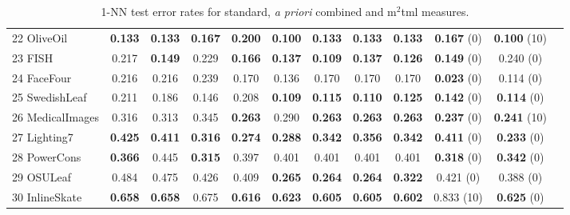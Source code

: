 \begin{table}[h!]
{\begin{tabular}{|l|ccccc|ccc|ccc|}
			22 OliveOil            & \textbf{0.133} & \textbf{0.133} & \textbf{0.167} & \textbf{0.200} & \textbf{0.100}    & \textbf{0.133} & \textbf{0.133} & \textbf{0.133} & \textbf{0.167} (0)  & \textbf{0.100} (10) & \checkmark \\			
			23 FISH                & 0.217 & \textbf{0.149} & 0.229 & \textbf{0.166} & \textbf{0.137}   & \textbf{0.109} & \textbf{0.137} & \textbf{0.126} & \textbf{0.149} (0)  & 0.240 (0) & \checkmark  \\			
			24 FaceFour            & 0.216 & 0.216 & 0.239 & 0.170 & 0.136 & 0.170 & 0.170 & 0.170 & \textbf{0.023} (0)     & 0.114 (0)  & \checkmark \\
			25 SwedishLeaf         & 0.211 & 0.186 & 0.146 & 0.208 & \textbf{0.109} & \textbf{0.115} & \textbf{0.110} & \textbf{0.125} & \textbf{0.142} (0) & \textbf{0.114} (0) & \checkmark \\			
			26 MedicalImages       & 0.316 & 0.313 & 0.345 & \textbf{0.263} & 0.290     & \textbf{0.263} & \textbf{0.263} & \textbf{0.263} & \textbf{0.237} (0) & \textbf{0.241} (10) & \checkmark \\
			27 Lighting7           & \textbf{0.425} & \textbf{0.411} & \textbf{0.316} & \textbf{0.274} & \textbf{0.288}     & \textbf{0.342} & \textbf{0.356} & \textbf{0.342} & \textbf{0.411} (0)  & \textbf{0.233} (0) & \checkmark \\
			28 PowerCons           & \textbf{0.366} & 0.445 & \textbf{0.315} & 0.397 & 0.401     & 0.401 & 0.401 & 0.401 & \textbf{0.318} (0)  & \textbf{0.342} (0) & \checkmark \\												
			29 OSULeaf             & 0.484 & 0.475 & 0.426 & 0.409 & \textbf{0.265}    & \textbf{0.264} & \textbf{0.264} & \textbf{0.322} & 0.421 (0)  & 0.388 (0)  & \checkmark \\
			30 InlineSkate         & \textbf{0.658} & \textbf{0.658} & 0.675 & \textbf{0.616} & \textbf{0.623}     & \textbf{0.605} & \textbf{0.605} & \textbf{0.602} & 0.833  (10) & \textbf{0.625} (0) & \checkmark \\
			\hline
		\end{tabular}
	}
	\caption{1-NN test error rates for standard, \textit{a priori} combined and {\sc m}$^2${\sc tml} measures.}
	\label{tab-resu}
\end{table}

